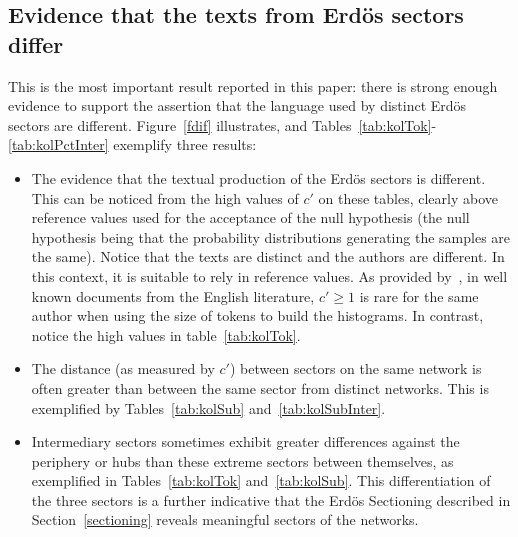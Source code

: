 \documentclass[review]{elsarticle}
\begin{document}
\subsection{Evidence that the texts from Erd\"os sectors differ}\label{subsec:di}
This is the most important result reported in this paper: there is strong enough evidence
to support the assertion that the language used by distinct Erd\"os sectors are different.
Figure~\ref{fdif} illustrates, and Tables~\ref{tab:kolTok}-\ref{tab:kolPctInter}
exemplify three results:
\begin{itemize}
 \item The evidence that the textual production of the Erd\"os sectors is different.
	 This can be noticed from the high values of $c'$ on these tables, clearly above reference values used for the acceptance of the null hypothesis (the null hypothesis being that the probability distributions generating the samples are the same).
         Notice that the texts are distinct and the authors are different.
         In this context, it is suitable to rely in reference values.
         As provided by~\cite{kolm},
         in well known documents from the English literature,
         $c'\geq 1$ is rare for the same author when using the size of tokens to build the histograms.
         In contrast, notice the high values in table~\ref{tab:kolTok}.
 \item The distance (as measured by $c'$) between sectors on the same network is often greater than between the same sector from distinct networks.
   This is exemplified by Tables~\ref{tab:kolSub} and~\ref{tab:kolSubInter}.
  \item Intermediary sectors sometimes exhibit greater differences 
against the periphery or hubs than these extreme sectors between themselves,
as exemplified in Tables~\ref{tab:kolTok} and~\ref{tab:kolSub}.
This differentiation of the three sectors is a further indicative that the Erd\"os Sectioning described in Section~\ref{sectioning} reveals meaningful sectors of the networks.
 \end{itemize}
\end{document}
